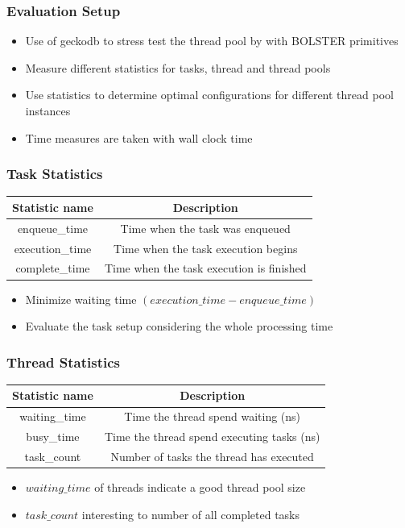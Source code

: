 \documentclass{beamer}
\begin{document}
\begin{frame}
	\frametitle{Evaluation Setup}
	\begin{itemize}
		\item Use of geckodb to stress test the thread pool by with BOLSTER primitives
		\item Measure different statistics for tasks, thread and thread pools
		\item Use statistics to determine optimal configurations for different thread pool instances
		\item Time measures are taken with wall clock time
	\end{itemize}
\end{frame}

\begin{frame}
	\frametitle{Task Statistics}
	\begin{center}
		\begin{tabular}{ c c }
			\hline
			\textbf{Statistic name}&\textbf{Description}\\
			\hline
			enqueue\_time & Time when the task was enqueued \\
			execution\_time & Time when the task execution begins \\
			complete\_time & Time when the task execution is finished \\
			\hline
		\end{tabular}
		\label{tab2}
	\end{center}
	\begin{itemize}
		\item Minimize waiting time $(execution\_time - enqueue\_time)$
		\item Evaluate the task setup considering the whole processing time 
	\end{itemize}
\end{frame}

\begin{frame}
	\frametitle{Thread Statistics}
	\begin{center}
		\begin{tabular}{ c c }
			\hline
			\textbf{Statistic name}&\textbf{Description}\\
			\hline
			waiting\_time & Time the thread spend waiting (ns) \\
			busy\_time & Time the thread spend executing tasks (ns)\\
			task\_count & Number of tasks the thread has executed \\
			\hline
		\end{tabular}
		\label{tab3}
	\end{center}
	\begin{itemize}
		\item $waiting\_time$ of threads indicate a good thread pool size
		\item $task\_count$ interesting to number of all completed tasks
	\end{itemize}
\end{frame}
\end{document}
